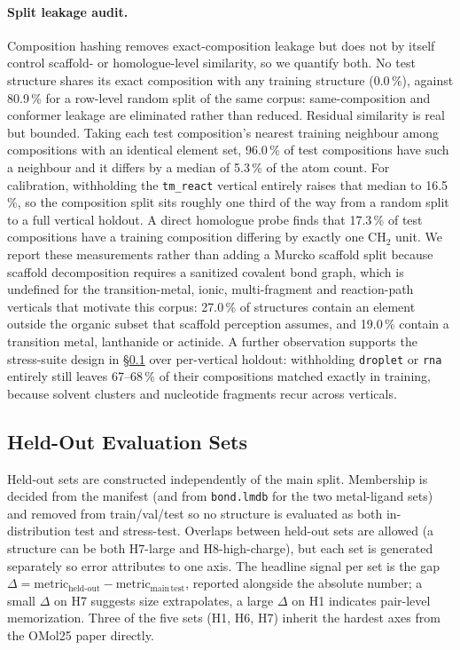 \begingroup\color{revcolor}
\paragraph{Split leakage audit.}
Composition hashing removes exact-composition leakage but does not by itself
control scaffold- or homologue-level similarity, so we quantify both. No test
structure shares its exact composition with any training structure (0.0\,\%),
against 80.9\,\% for a row-level random split of the same corpus: same-composition
and conformer leakage are eliminated rather than reduced. Residual similarity is
real but bounded. Taking each test composition's nearest training neighbour among
compositions with an identical element set, 96.0\,\% of test compositions have such
a neighbour and it differs by a median of 5.3\,\% of the atom count. For
calibration, withholding the \texttt{tm\_react} vertical entirely raises that
median to 16.5\,\%, so the composition split sits roughly one third of the way from
a random split to a full vertical holdout. A direct homologue probe finds that
17.3\,\% of test compositions have a training composition differing by exactly one
CH$_2$ unit. We report these measurements rather than adding a Murcko scaffold
split because scaffold decomposition requires a sanitized covalent bond graph,
which is undefined for the transition-metal, ionic, multi-fragment and
reaction-path verticals that motivate this corpus: 27.0\,\% of structures contain
an element outside the organic subset that scaffold perception assumes, and
19.0\,\% contain a transition metal, lanthanide or actinide. A further observation
supports the stress-suite design in \S\ref{sec:eval-holdouts} over per-vertical
holdout: withholding \texttt{droplet} or \texttt{rna} entirely still leaves
67--68\,\% of their compositions matched exactly in training, because solvent
clusters and nucleotide fragments recur across verticals.
\endgroup

\subsection{Held-Out Evaluation Sets}
\label{sec:eval-holdouts}

Held-out sets are constructed independently of the main split. Membership is
decided from the manifest (and from \texttt{bond.lmdb} for the two metal-ligand
sets) and removed from train/val/test so no structure is evaluated as both
in-distribution test and stress-test.  Overlaps between held-out sets are allowed
(a structure can be both H7-large and H8-high-charge), but each set is generated
separately so error attributes to one axis. The headline signal per set is the
gap $\Delta = \mathrm{metric}_{\mathrm{held\text{-}out}} -
\mathrm{metric}_{\mathrm{main\,test}}$, reported alongside the absolute number;
a small $\Delta$ on H7 suggests size extrapolates, a large $\Delta$ on H1
indicates pair-level memorization. Three of the five sets (H1, H6, H7) inherit
the hardest axes from the OMol25 paper directly.

